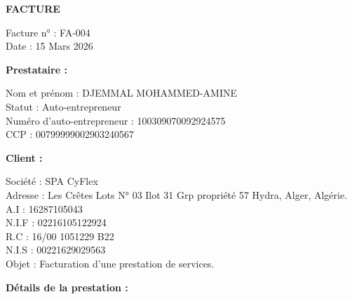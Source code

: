 \documentclass[a4paper,12pt]{article}
\begin{document}
\begin{center}
  {\Large\bfseries FACTURE}
\end{center}

\vspace{0.5cm}

Facture n° : FA-004\\
Date : 15 Mars 2026

\vspace{0.8cm}

\textbf{Prestataire :}

Nom et prénom : DJEMMAL MOHAMMED-AMINE\\
Statut : Auto-entrepreneur\\
Numéro d'auto-entrepreneur : 100309070092924575\\
CCP : 00799999002903240567

\vspace{0.8cm}

\textbf{Client :}

Société : SPA CyFlex\\
Adresse : Les Crêtes Lots N° 03 Ilot 31 Grp propriété 57 Hydra, Alger, Algérie.\\
A.I : 16287105043\\
N.I.F : 02216105122924\\
R.C : 16/00 1051229 B22\\
N.I.S : 00221629029563\\
Objet : Facturation d'une prestation de services.

\vspace{0.8cm}

\textbf{Détails de la prestation :}

\vspace{0.3cm}
\end{document}
